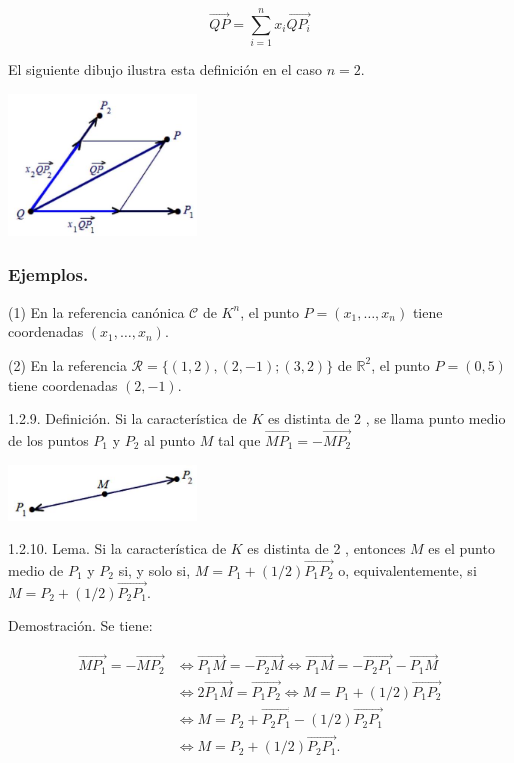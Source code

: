 \documentclass[12pt, a4paper, ones, notitlepage, openany,titlepage]{article}
\begin{document}
$$
\overrightarrow{Q P}=\sum_{i=1}^{n} x_{i} \overrightarrow{Q P_{i}}
$$

El siguiente dibujo ilustra esta definición en el caso $n=2$.

\begin{center}
\includegraphics[max width=5cm]{2023_03_01_7659aec5e35f9a9b2d3cg-12(2)}
\end{center}

\subsubsection{Ejemplos.}
(1) En la referencia canónica $\mathcal{C}$ de $K^{n}$, el punto $P=\left(x_{1}, \ldots, x_{n}\right)$ tiene coordenadas $\left(x_{1}, \ldots, x_{n}\right)$.

(2) En la referencia $\mathcal{R}=\{(1,2),(2,-1) ;(3,2)\}$ de $\mathbb{R}^{2}$, el punto $P=(0,5)$ tiene coordenadas $(2,-1)$.

1.2.9. Definición. Si la característica de $K$ es distinta de 2 , se llama punto medio de los puntos $P_{1}$ y $P_{2}$ al punto $M$ tal que $\overrightarrow{M P_{1}}=-\overrightarrow{M P_{2}}$

\begin{center}
\includegraphics[max width=5cm]{2023_03_01_7659aec5e35f9a9b2d3cg-12}
\end{center}

1.2.10. Lema. Si la característica de $K$ es distinta de 2 , entonces $M$ es el punto medio de $P_{1}$ y $P_{2}$ si, y solo si, $M=P_{1}+(1 / 2) \overrightarrow{P_{1} P_{2}}$ o, equivalentemente, si $M=P_{2}+(1 / 2) \overrightarrow{P_{2} P_{1}}$.

Demostración. Se tiene:

$$
\begin{aligned}
\overrightarrow{M P_{1}}=-\overrightarrow{M P_{2}} & \Longleftrightarrow \overrightarrow{P_{1} M}=-\overrightarrow{P_{2} M} \Longleftrightarrow \overrightarrow{P_{1} M}=-\overrightarrow{P_{2} P_{1}}-\overrightarrow{P_{1} M} \\
& \Longleftrightarrow 2 \overrightarrow{P_{1} M}=\overrightarrow{P_{1} P_{2}} \Longleftrightarrow M=P_{1}+(1 / 2) \overrightarrow{P_{1} P_{2}} \\
& \Longleftrightarrow M=P_{2}+\overrightarrow{P_{2} P_{1}}-(1 / 2) \overrightarrow{P_{2} P_{1}} \\
& \Longleftrightarrow M=P_{2}+(1 / 2) \overrightarrow{P_{2} P_{1}} .
\end{aligned}
$$
\end{document}

